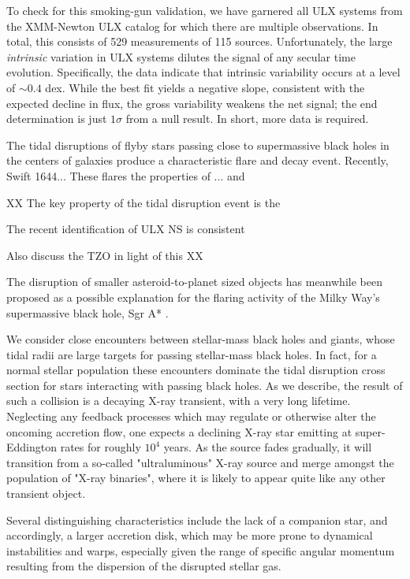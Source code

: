 To check for this smoking-gun validation, we have garnered all ULX
systems from the \citet{Walton_2011} XMM-Newton ULX catalog for which
there are multiple observations.  In total, this consists of 529
measurements of 115 sources.  Unfortunately, the large {\em intrinsic}
variation in ULX systems dilutes the signal of any secular time
evolution.  Specifically, the data indicate that intrinsic variability
occurs at a level of $\sim0.4$ dex.  While the best fit yields a
negative slope, consistent with the expected decline in flux, the
gross variability weakens the net signal; the end determination is
just $1\sigma$ from a null result.  In short, more data is required.


The tidal disruptions of flyby stars passing close to supermassive
black holes in the centers of galaxies produce a characteristic 
flare and decay event.  Recently, Swift 1644...
These flares the properties of ... and 



XX
The key property of the tidal disruption event is the 

The recent identification of ULX NS is consistent 

Also discuss the TZO in light of this
XX


The disruption of smaller asteroid-to-planet sized objects has
meanwhile been proposed as a possible explanation for the flaring
activity of the Milky Way's supermassive black hole, Sgr A* \citep{SSS}.


We consider close encounters between stellar-mass black holes and giants, whose tidal radii are large targets for passing stellar-mass black holes.  In fact, for a normal stellar population these encounters dominate the tidal disruption cross section for stars interacting with passing black holes.  As we describe, the result of such a collision is a decaying X-ray transient, with a very long lifetime.  Neglecting any feedback processes which may regulate or otherwise alter the oncoming accretion flow, one expects a declining X-ray star emitting at super-Eddington rates for roughly $10^4$ years.  As the source fades gradually, it will transition from a so-called "ultraluminous" X-ray source and merge amongst the population of "X-ray binaries", where it is likely to appear quite like any other transient object. 

Several distinguishing characteristics include the lack of a companion star, and accordingly, a larger accretion disk, which may be more prone to dynamical instabilities and warps, especially given the range of specific angular momentum resulting from the dispersion of the disrupted stellar gas.

